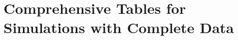 \section{Comprehensive Tables for Simulations with Complete Data}
\begin{landscape}
%

\end{landscape}
